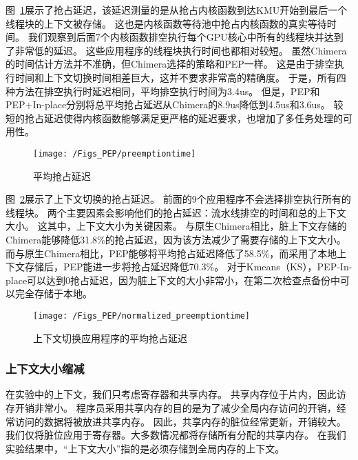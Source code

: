 图~\ref{fig:preemptiontime}展示了抢占延迟，该延迟测量的是从抢占内核函数到达KMU开始到最后一个线程块的上下文被存储。
这也是内核函数等待池中抢占内核函数的真实等待时间。
我们观察到后面7个内核函数排空执行每个GPU核心中所有的线程块并达到了非常低的延迟。
这些应用程序的线程块执行时间也都相对较短。
虽然Chimera的时间估计方法并不准确，但Chimera选择的策略和PEP一样。
这是由于排空执行时间和上下文切换时间相差巨大，这并不要求非常高的精确度。
于是，所有四种方法在排空执行时延迟相同，平均排空执行时间为3.4us。
但是，PEP和PEP+In-place分别将总平均抢占延迟从Chimera的8.9us降低到4.5us和3.6us。
较短的抢占延迟使得内核函数能够满足更严格的延迟要求，也增加了多任务处理的可用性。

\begin{figure}[htbp] %
  \centering
  \texttt{[image: /Figs\_PEP/preemptiontime]}
  \caption{平均抢占延迟}
  \label{fig:preemptiontime}
\end{figure}


图~\ref{fig:normalized_preemptiontime}展示了上下文切换的抢占延迟。
前面的9个应用程序不会选择排空执行所有的线程块。
两个主要因素会影响他们的抢占延迟：流水线排空的时间和总的上下文大小。
这其中，上下文大小为关键因素。
与原生Chimera相比，脏上下文存储的Chimera能够降低31.8\%的抢占延迟，因为该方法减少了需要存储的上下文大小。
而与原生Chimera相比，PEP能够将平均抢占延迟降低了58.5\%，而采用了本地上下文存储后，PEP能进一步将抢占延迟降低70.3\%。
对于Kmeans（KS），PEP-In-place可以达到0抢占延迟，因为脏上下文的大小非常小，在第二次检查点备份中可以完全存储于本地。

\begin{figure}[htbp] %
  \centering
  \texttt{[image: /Figs\_PEP/normalized\_preemptiontime]}
  \caption{上下文切换应用程序的平均抢占延迟}
  \label{fig:normalized_preemptiontime}
\end{figure}

\subsubsection{上下文大小缩减}

在实验中的上下文，我们只考虑寄存器和共享内存。
共享内存位于片内，因此访存开销非常小。
程序员采用共享内存的目的是为了减少全局内存访问的开销，经常访问的数据将被放进共享内存。
因此，共享内存的脏位经常更新，开销较大。
我们仅将脏位应用于寄存器。大多数情况都将存储所有分配的共享内存。
在我们实验结果中，“上下文大小”指的是必须存储到全局内存的上下文。

